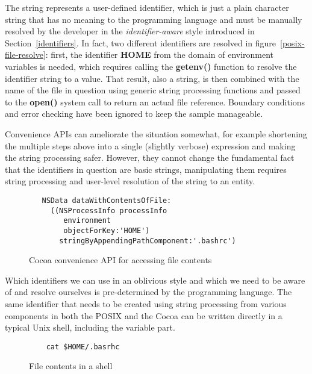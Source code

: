 \documentclass[preprint,authoryear]{acm_proc_article-sp}
\begin{document}
The string represents a user-defined identifier, which is just a plain character
string that has no meaning to the programming language and must be 
manually resolved by the developer in the {\em identifier-aware} style 
introduced in Section~\ref{identifiers}.  In fact, two different identifiers
are resolved in figure~\ref{posix-file-resolve}:  first, the identifier {\bf HOME}
from the domain of environment variables is needed, which requires calling
the {\bf getenv()} function to resolve the identifier string to a value.  That result,
also a string, is then combined with the name of the file in question using generic
string processing functions and passed
to the {\bf open()} system call to return an actual file reference.  Boundary conditions
and error checking have been ignored to keep the sample manageable.

Convenience APIs can ameliorate the situation somewhat, for example shortening 
the multiple steps above into a single (slightly verbose) expression and making the
string processing safer.  However, they cannot
change the fundamental fact that the identifiers in question are basic strings,
manipulating them requires string processing and user-level resolution of the
string to an entity.

\begin{figure}[htbp]
\begin{center}
\begin{small}
\begin{verbatim}
   NSData dataWithContentsOfFile:
     ((NSProcessInfo processInfo
        environment 
        objectForKey:'HOME') 
       stringByAppendingPathComponent:'.bashrc')

\end{verbatim}
\end{small}
\caption{Cocoa convenience API for accessing file contents}
\label{cocoa-file-contents}
\end{center}
\end{figure}


Which identifiers we can use in an oblivious style and which we need to
be aware of and resolve ourselves is pre-determined by the programming
language.
The same identifier that needs to be created using string processing from various
components in both the POSIX and the Cocoa can be written directly in a typical
Unix shell, including the variable part.

\begin{figure}[htbp]
\begin{center}
\begin{small}
\begin{verbatim}
	cat $HOME/.basrhc
\end{verbatim}
\end{small}
\caption{File contents in a shell}
\label{sh-file-contents}
\end{center}
\end{figure}
\end{document}
